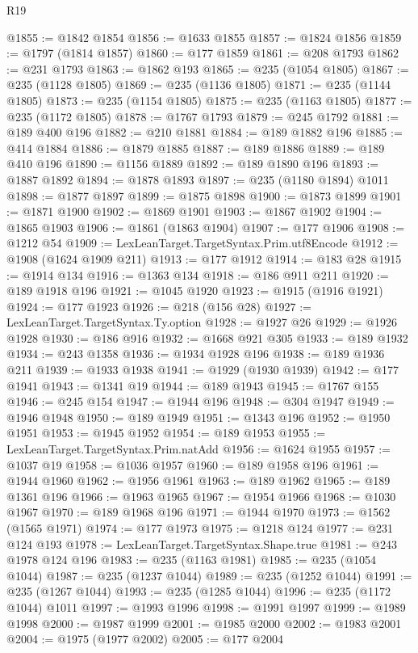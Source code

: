 \begin{lexlean}{R19}
\begin{coremodule}
@1855 := @1842 @1854
@1856 := @1633 @1855
@1857 := @1824 @1856
@1859 := @1797 (@1814 @1857)
@1860 := @177 @1859
@1861 := @208 @1793
@1862 := @231 @1793
@1863 := @1862 @193
@1865 := @235 (@1054 @1805)
@1867 := @235 (@1128 @1805)
@1869 := @235 (@1136 @1805)
@1871 := @235 (@1144 @1805)
@1873 := @235 (@1154 @1805)
@1875 := @235 (@1163 @1805)
@1877 := @235 (@1172 @1805)
@1878 := @1767 @1793
@1879 := @245 @1792
@1881 := @189 @400 @196
@1882 := @210 @1881
@1884 := @189 @1882 @196
@1885 := @414 @1884
@1886 := @1879 @1885
@1887 := @189 @1886
@1889 := @189 @410 @196
@1890 := @1156 @1889
@1892 := @189 @1890 @196
@1893 := @1887 @1892
@1894 := @1878 @1893
@1897 := @235 (@1180 @1894) @1011
@1898 := @1877 @1897
@1899 := @1875 @1898
@1900 := @1873 @1899
@1901 := @1871 @1900
@1902 := @1869 @1901
@1903 := @1867 @1902
@1904 := @1865 @1903
@1906 := @1861 (@1863 @1904)
@1907 := @177 @1906
@1908 := @1212 @54
@1909 := LexLeanTarget.TargetSyntax.Prim.utf8Encode
@1912 := @1908 (@1624 @1909 @211)
@1913 := @177 @1912
@1914 := @183 @28
@1915 := @1914 @134
@1916 := @1363 @134
@1918 := @186 @911 @211
@1920 := @189 @1918 @196
@1921 := @1045 @1920
@1923 := @1915 (@1916 @1921)
@1924 := @177 @1923
@1926 := @218 (@156 @28)
@1927 := LexLeanTarget.TargetSyntax.Ty.option
@1928 := @1927 @26
@1929 := @1926 @1928
@1930 := @186 @916
@1932 := @1668 @921 @305
@1933 := @189 @1932
@1934 := @243 @1358
@1936 := @1934 @1928 @196
@1938 := @189 @1936 @211
@1939 := @1933 @1938
@1941 := @1929 (@1930 @1939)
@1942 := @177 @1941
@1943 := @1341 @19
@1944 := @189 @1943
@1945 := @1767 @155
@1946 := @245 @154
@1947 := @1944 @196
@1948 := @304 @1947
@1949 := @1946 @1948
@1950 := @189 @1949
@1951 := @1343 @196
@1952 := @1950 @1951
@1953 := @1945 @1952
@1954 := @189 @1953
@1955 := LexLeanTarget.TargetSyntax.Prim.natAdd
@1956 := @1624 @1955
@1957 := @1037 @19
@1958 := @1036 @1957
@1960 := @189 @1958 @196
@1961 := @1944 @1960
@1962 := @1956 @1961
@1963 := @189 @1962
@1965 := @189 @1361 @196
@1966 := @1963 @1965
@1967 := @1954 @1966
@1968 := @1030 @1967
@1970 := @189 @1968 @196
@1971 := @1944 @1970
@1973 := @1562 (@1565 @1971)
@1974 := @177 @1973
@1975 := @1218 @124
@1977 := @231 @124 @193
@1978 := LexLeanTarget.TargetSyntax.Shape.true
@1981 := @243 @1978 @124 @196
@1983 := @235 (@1163 @1981)
@1985 := @235 (@1054 @1044)
@1987 := @235 (@1237 @1044)
@1989 := @235 (@1252 @1044)
@1991 := @235 (@1267 @1044)
@1993 := @235 (@1285 @1044)
@1996 := @235 (@1172 @1044) @1011
@1997 := @1993 @1996
@1998 := @1991 @1997
@1999 := @1989 @1998
@2000 := @1987 @1999
@2001 := @1985 @2000
@2002 := @1983 @2001
@2004 := @1975 (@1977 @2002)
@2005 := @177 @2004

\end{coremodule}
\end{lexlean}
